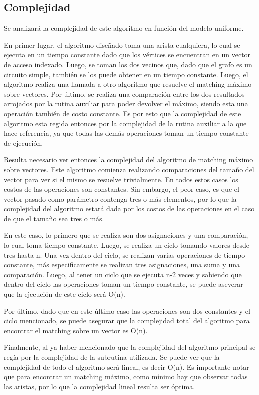 \documentclass[a4paper, 12pt]{article}
\begin{document}
\subsection*{Complejidad}
Se analizará la complejidad de este algoritmo en función del modelo uniforme.

En primer lugar, el algoritmo dise\~{n}ado toma una arista cualquiera, lo cual se ejecuta en un tiempo constante dado que los vértices se encuentran en un vector de acceso indexado. Luego, se toman los dos vecinos que, dado que el grafo es un circuito simple, también se los puede obtener en un tiempo constante. Luego, el algoritmo realiza una llamada a otro algoritmo que resuelve el matching máximo sobre vectores. Por último, se realiza una comparación entre los dos resultados arrojados por la rutina auxiliar para poder devolver el máximo, siendo esta una operación también de costo constante. Es por esto que la complejidad de este algoritmo esta regida entonces por la complejidad de la rutina auxiliar a la que hace referencia, ya que todas las demás operaciones toman un tiempo constante de ejecución.

Resulta necesario ver entonces la complejidad del algoritmo de matching máximo sobre vectores.
Este algoritmo comienza realizando comparaciones del tama\~{n}o del vector para ver si el mismo se resuelve trivialmente. En todos estos casos los costos de las operaciones son constantes. Sin embargo, el peor caso, es que el vector pasado como parámetro contenga tres o más elementos, por lo que la complejidad del algoritmo estará dada por los costos de las operaciones en el caso de que el tama\~{n}o sea tres o más.

En este caso, lo primero que se realiza son dos asignaciones y una comparación, lo cual toma tiempo constante. Luego, se realiza un ciclo tomando valores desde tres hasta n. Una vez dentro del ciclo, se realizan varias operaciones de tiempo constante, más especificamente se realizan tres asignaciones, una suma y una comparación. Luego, al tener un ciclo que se ejecuta n-2 veces y sabiendo que dentro del ciclo las operaciones toman un tiempo constante, se puede aseverar que la ejecución de este ciclo será O(n). 

Por último, dado que en este último caso las operaciones son dos constantes y el ciclo mencionado, se puede asegurar que la complejidad total del algoritmo para encontrar el matching sobre un vector es O(n).

Finalmente, al ya haber mencionado que la complejidad del algoritmo principal se regía por la complejidad de la subrutina utilizada. Se puede ver que la complejidad de todo el algoritmo será lineal, es decir O(n). Es importante notar que para encontrar un matching máximo, como mínimo hay que observar todas las aristas, por lo que la complejidad lineal resulta ser óptima.
\end{document}
